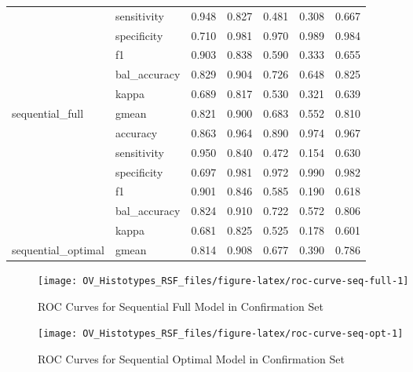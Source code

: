 \documentclass[
]{report}
\begin{document}
\begin{table}
\begin{tabular}[t]{l|l|r|r|r|r|r}
\cline{2-7}
 & sensitivity & 0.948 & 0.827 & 0.481 & 0.308 & 0.667\\
\cline{2-7}
 & specificity & 0.710 & 0.981 & 0.970 & 0.989 & 0.984\\
\cline{2-7}
 & f1 & 0.903 & 0.838 & 0.590 & 0.333 & 0.655\\
\cline{2-7}
 & bal\_accuracy & 0.829 & 0.904 & 0.726 & 0.648 & 0.825\\
\cline{2-7}
 & kappa & 0.689 & 0.817 & 0.530 & 0.321 & 0.639\\
\cline{2-7}
\multirow{-7}{*}{\raggedright\arraybackslash sequential\_full} & gmean & 0.821 & 0.900 & 0.683 & 0.552 & 0.810\\
\cline{1-7}
 & accuracy & 0.863 & 0.964 & 0.890 & 0.974 & 0.967\\
\cline{2-7}
 & sensitivity & 0.950 & 0.840 & 0.472 & 0.154 & 0.630\\
\cline{2-7}
 & specificity & 0.697 & 0.981 & 0.972 & 0.990 & 0.982\\
\cline{2-7}
 & f1 & 0.901 & 0.846 & 0.585 & 0.190 & 0.618\\
\cline{2-7}
 & bal\_accuracy & 0.824 & 0.910 & 0.722 & 0.572 & 0.806\\
\cline{2-7}
 & kappa & 0.681 & 0.825 & 0.525 & 0.178 & 0.601\\
\cline{2-7}
\multirow{-7}{*}{\raggedright\arraybackslash sequential\_optimal} & gmean & 0.814 & 0.908 & 0.677 & 0.390 & 0.786\\
\hline
\end{tabular}
\end{table}

\begin{figure}[H]

{\centering \texttt{[image: OV\_Histotypes\_RSF\_files/figure-latex/roc-curve-seq-full-1]} 

}

\caption{ROC Curves for Sequential Full Model in Confirmation Set}\label{fig:roc-curve-seq-full}
\end{figure}

\begin{figure}[H]

{\centering \texttt{[image: OV\_Histotypes\_RSF\_files/figure-latex/roc-curve-seq-opt-1]} 

}

\caption{ROC Curves for Sequential Optimal Model in Confirmation Set}\label{fig:roc-curve-seq-opt}
\end{figure}
\end{document}
